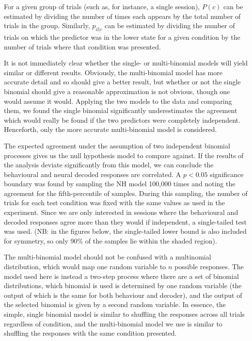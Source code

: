 For a given group of trials (such as, for instance, a single session), $P(c)$ can be estimated by dividing the number of times each appears by the total number of trials in the group. Similarly, $p_{il|c}$ can be estimated by dividing the number of trials on which the predictor was in the lower state for a given condition by the number of trials where that condition was presented.

It is not immediately clear whether the single- or multi-binomial models will yield similar or different results. Obviously, the multi-binomial model has more accurate detail and so should give a better result, but whether or not the single binomial should give a reasonable approximation is not obvious, though one would assume it would.
Applying the two models to the data and comparing them, we found the single binomial significantly underestimates the agreement which would really be found if the two predictors were completely independent. Henceforth, only the more accurate multi-binomial model is considered.

The expected agreement under the assumption of two independent binomial processes gives us the null hypothesis model to compare against. If the results of the analysis deviate significantly from this model, we can conclude the behavioural and neural decoded responses are correlated. A $p<0.05$ significance boundary was found by sampling the NH model 100,000 times and noting the agreement for the fifth-percentile of samples. During this sampling, the number of trials for each test condition was fixed with the same values as used in the experiment. Since we are only interested in sessions where the behavioural and decoded responses agree more than they would if independent, a single-tailed test was used. (NB: in the figures below, the single-tailed lower bound is also included for symmetry, so only 90\% of the samples lie within the shaded region).

The multi-binomial model should not be confused with a multinomial distribution, which would map one random variable to $n$ possible responses. The model used here is instead a two-step process where there are a set of binomial distributions, which binomial is used is determined by one random variable (the output of which is the same for both behaviour and decoder), and the output of the selected binomial is given by a second random variable. In essence, the simple, single binomial model is similar to shuffling the responses across all trials regardless of condition, and the multi-binomial model we use is similar to shuffling the responses with the same condition presented.


